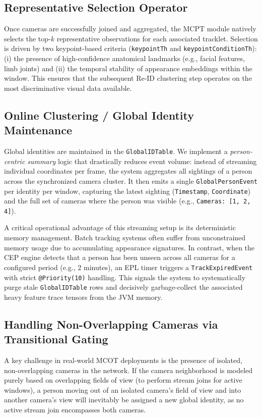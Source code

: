\documentclass[11pt]{article}
\begin{document}
\subsection{Representative Selection Operator}
Once cameras are successfully joined and aggregated, the MCPT module natively selects the top-$k$ representative observations for each associated tracklet. Selection is driven by two keypoint-based criteria (\texttt{keypointTh} and \texttt{keypointConditionTh}): (i) the presence of high-confidence anatomical landmarks (e.g., facial features, limb joints) and (ii) the temporal stability of appearance embeddings within the window. This ensures that the subsequent Re-ID clustering step operates on the most discriminative visual data available.

\subsection{Online Clustering / Global Identity Maintenance}
Global identities are maintained in the \texttt{GlobalIDTable}. We implement a \textit{person-centric summary} logic that drastically reduces event volume: instead of streaming individual coordinates per frame, the system aggregates all sightings of a person across the synchronized camera cluster. It then emits a single \texttt{GlobalPersonEvent} per identity per window, capturing the latest sighting (\texttt{Timestamp}, \texttt{Coordinate}) and the full set of cameras where the person was visible (e.g., \texttt{Cameras: [1, 2, 4]}). 

A critical operational advantage of this streaming setup is its deterministic memory management. Batch tracking systems often suffer from unconstrained memory usage due to accumulating appearance signatures. In contrast, when the CEP engine detects that a person has been unseen across all cameras for a configured period (e.g., 2 minutes), an EPL timer triggers a \texttt{TrackExpiredEvent} with strict \texttt{@Priority(10)} handling. This signals the system to systematically purge stale \texttt{GlobalIDTable} rows and decisively garbage-collect the associated heavy feature trace tensors from the JVM memory.

\subsection{Handling Non-Overlapping Cameras via Transitional Gating}
A key challenge in real-world MCOT deployments is the presence of isolated, non-overlapping cameras in the network. If the camera neighborhood is modeled purely based on overlapping fields of view (to perform stream joins for active windows), a person moving out of an isolated camera's field of view and into another camera's view will inevitably be assigned a new global identity, as no active stream join encompasses both cameras. 
\end{document}
